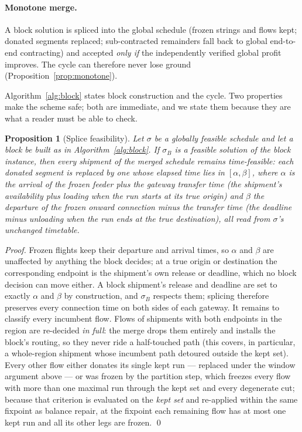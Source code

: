 \documentclass[11pt]{article}
\newtheorem{proposition}{Proposition}
\begin{document}
\paragraph{Monotone merge.} A block solution is spliced into the global
schedule (frozen strings and flows kept; donated segments replaced;
sub-contracted remainders fall back to global end-to-end contracting) and
accepted \emph{only if} the independently verified global profit improves.
The cycle can therefore never lose ground (Proposition~\ref{prop:monotone}).

Algorithm~\ref{alg:block} states block construction and the cycle. Two
properties make the scheme safe; both are immediate, and we state them
because they are what a reader must be able to check.

\begin{proposition}[Splice feasibility]\label{prop:splice}
Let $\sigma$ be a globally feasible schedule and let a block be built as in
Algorithm~\ref{alg:block}. If $\sigma_B$ is a feasible solution of the block
instance, then every shipment of the merged schedule remains time-feasible:
each donated segment is replaced by one whose elapsed time lies in
$[\alpha,\beta]$, where $\alpha$ is the arrival of the frozen feeder plus
the gateway transfer time (the shipment's availability plus loading when
the run starts at its true origin) and $\beta$ the departure of the frozen
onward connection minus the transfer time (the deadline minus unloading
when the run ends at the true destination), all read from $\sigma$'s
unchanged timetable.
\end{proposition}

\begin{proof}
Frozen flights keep their departure and arrival times, so $\alpha$ and $\beta$
are unaffected by anything the block decides; at a true origin or
destination the corresponding endpoint is the shipment's own release or
deadline, which no block decision can move either. A block shipment's
release and deadline are set to exactly $\alpha$ and $\beta$ by
construction, and $\sigma_B$ respects them; splicing therefore preserves
every connection time on both sides of each gateway. It remains to
classify every incumbent flow. Flows of shipments with both endpoints in
the region are re-decided \emph{in full}: the merge drops them entirely
and installs the block's routing, so they never ride a half-touched path
(this covers, in particular, a whole-region shipment whose incumbent path
detoured outside the kept set). Every other flow either donates its single
kept run --- replaced under the window argument above --- or was frozen by
the partition step, which freezes every flow with more than one maximal
run through the kept set and every degenerate cut; because that criterion
is evaluated on the \emph{kept set} and re-applied within the same
fixpoint as balance repair, at the fixpoint each remaining flow has at
most one kept run and all its other legs are frozen. \qed
\end{proof}
\end{document}
